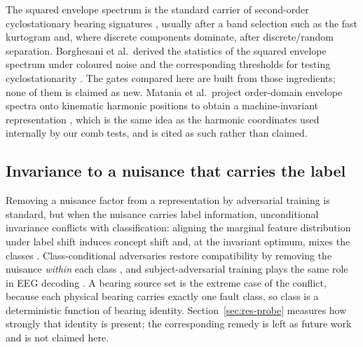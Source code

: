 The squared envelope spectrum is the standard carrier of second-order cyclostationary bearing signatures \cite{randall2011},
usually after a band selection such as the fast kurtogram \cite{antoni2007kurtogram} and, where discrete components
dominate, after discrete/random separation. Borghesani et al.\ derived the statistics of the squared envelope spectrum under
coloured noise and the corresponding thresholds for testing cyclostationarity \cite{borghesani2013}. The gates compared here
are built from those ingredients; none of them is claimed as new. Matania et al.\ project order-domain envelope spectra onto
kinematic harmonic positions to obtain a machine-invariant representation \cite{matania2025}, which is the same idea as the
harmonic coordinates used internally by our comb tests, and is cited as such rather than claimed.

\subsection{Invariance to a nuisance that carries the label}

Removing a nuisance factor from a representation by adversarial training is standard, but when the nuisance carries label
information, unconditional invariance conflicts with classification: aligning the marginal feature distribution under label
shift induces concept shift and, at the invariant optimum, mixes the classes \cite{liu2021labelshift}. Class-conditional
adversaries restore compatibility by removing the nuisance \emph{within} each class \cite{li2018ciddg}, and
subject-adversarial training plays the same role in EEG decoding \cite{ozdenizci2020eeg}. A bearing source set is the extreme
case of the conflict, because each physical bearing carries exactly one fault class, so class is a deterministic function of
bearing identity. Section~\ref{sec:res-probe} measures how strongly that identity is present; the corresponding remedy is
left as future work and is not claimed here.
